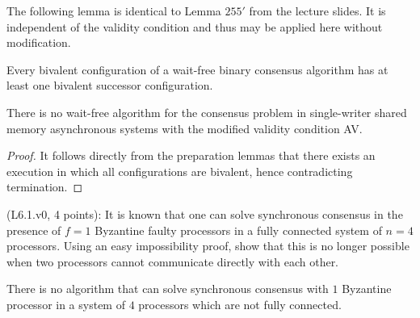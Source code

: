 The following lemma is identical to Lemma $255'$ from the lecture slides.
It is independent of the validity condition and thus may be applied here without modification.

\begin{lemma}
Every bivalent configuration of a wait-free binary consensus algorithm has at least one bivalent
successor configuration.
\end{lemma}

\begin{theorem}
There is no wait-free algorithm for the consensus problem in single-writer shared memory
asynchronous systems with the modified validity condition AV.
\end{theorem}

\begin{proof}
It follows directly from the preparation lemmas that there exists an execution in which
all configurations are bivalent, hence contradicting termination.
\end{proof}


\begin{Exc}{(L6.1.v0, 4 points):}
It is known that one can solve synchronous consensus
in the presence of $f=1$ Byzantine faulty processors
in a fully connected system of $n=4$ processors. Using an easy
impossibility proof, show that this is no longer possible when
two processors cannot communicate directly with each other.
\end{Exc}

\begin{theorem}
There is no algorithm that can solve synchronous consensus with $1$ Byzantine
processor in a system of $4$ processors which are not fully connected.
\end{theorem}


